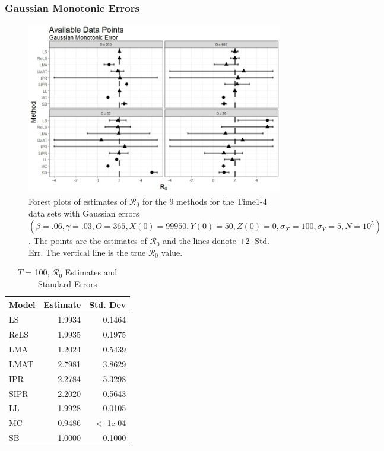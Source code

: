 \documentclass[12pt]{article}
\newcommand{\xxsir}{\ensuremath{9} } %
\newcommand{\rr}{\ensuremath{\mathcal{R}_0}}
\begin{document}
\subsubsection{Gaussian Monotonic Errors}
\begin{figure}[H]
	\centering
	\includegraphics[scale=0.5]{images/time_nm.jpeg}
	\caption{Forest plots of estimates of $\rr$ for the \xxsir methods for the Time1-4 data sets with Gaussian errors $(\beta=.06, \gamma=.03, O=365, X(0)=99950, Y(0)=50, Z(0)=0, \sigma_X=100, \sigma_Y=5, N=10^5)$.  The points are the estimates of $\rr$ and the lines denote $\pm 2\cdot $Std. Err.  The vertical line is the true $\rr$ value.}
\end{figure}

\begin{table}[H]
	
	
	\centering
	\begin{tabular}[t]{l|r|r}
		\hline
		Model & Estimate & Std. Dev\\
		\hline
		LS & 1.9934 & 0.1464\\
		\hline
		ReLS & 1.9935 & 0.1975\\
		\hline
		LMA & 1.2024 & 0.5439\\
		\hline
		LMAT & 2.7981 & 3.8629\\
		\hline
		IPR & 2.2784 & 5.3298\\
		\hline
		SIPR & 2.2020 & 0.5643\\
		\hline
		LL & 1.9928 & 0.0105\\
		\hline
		MC & 0.9486 & $<$ 1e-04\\
		\hline
		SB & 1.0000 & 0.1000\\
		\hline
	\end{tabular}
	\caption{ $T$ = 100, $\rr$ Estimates and Standard Errors}
\end{table}
\end{document}
